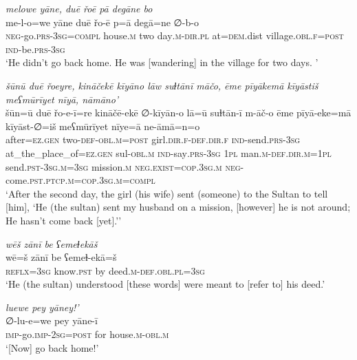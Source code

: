 \ea \label{ŽH.109}
\textit{melowe yāne, duē řoē pā degāne bo} \\ 
\gll me-l-o=we yāne duē řo-ē p=ā degā=ne ∅-b-o \\ 
 \textsc{neg-}go\textsc{.prs}\textsc{-3sg}\textsc{=compl} house\textsc{.m} two day\textsc{.m}\textsc{-dir}\textsc{.pl} at\textsc{=dem}.dist village\textsc{.obl}\textsc{\textsc{.f}}\textsc{=\textsc{post}} \textsc{ind-}be\textsc{.prs}\textsc{-3sg} \\ 
\glt `He didn’t go back home. He was [wandering] in the village for two days. '
\z 
 
\ea \label{ŽH.110}
\textit{šūnū duē řoeyre, kināčekē kīyāno lāw suɫtānī māčo, ēme pīyākemā kīyāstiš meʕmūrīyet nīyā, nāmāno’} \\ 
\gll šūn=ū duē řo-e-ī=re kināčē-ekē ∅-kīyān-o lā=ū suɫtān-ī m-āč-o ēme pīyā-eke=mā kīyāst-∅=iš meʕmūrīyet nīye=ā ne-āmā=n=o \\ 
 after\textsc{=ez}\textsc{.gen} two\textsc{-def}\textsc{-obl}\textsc{.m}\textsc{=\textsc{post}} girl\textsc{.dir}\textsc{\textsc{.f}}\textsc{-def}\textsc{.dir}\textsc{\textsc{.f}} \textsc{ind-}send\textsc{.prs}\textsc{-3sg} at\_the\_place\_of\textsc{=ez}\textsc{.gen} sul\textsc{-obl}\textsc{.m} \textsc{ind-}say\textsc{.prs}\textsc{-3sg} \textsc{1pl} man\textsc{.m}\textsc{-def}\textsc{.dir}\textsc{.m}\textsc{=1pl} send\textsc{.pst}\textsc{-3sg}\textsc{.m}\textsc{=3sg} mission\textsc{.m} \textsc{\textsc{neg.}exist}\textsc{=cop}\textsc{.3sg}\textsc{.m} \textsc{neg-}come\textsc{.pst}\textsc{.ptcp}\textsc{.m}\textsc{=cop}\textsc{.3sg}\textsc{.m}\textsc{=compl} \\ 
\glt `After the second day, the girl (his wife) sent (someone) to the Sultan to tell [him], ‘He (the sultan) sent my husband on a mission, [however] he is not around; He hasn’t come back [yet].’'
\z 
 
\ea \label{ŽH.115}
\textit{wēš zānī be ʕemeɫekāš} \\ 
\gll wē=š zānī be ʕemeɫ-ekā=š \\ 
 \textsc{reflx}\textsc{=3sg} know\textsc{.pst} by deed\textsc{.m}\textsc{-def}\textsc{.obl}\textsc{.pl}\textsc{=3sg} \\ 
\glt `He (the sultan) understood [these words] were meant to [refer to] his deed.'
\z 
 
\ea \label{ŽH.118}
\textit{luewe pey yāney!’} \\ 
\gll ∅-lu-e=we pey yāne-ī \\ 
 \textsc{imp-}go.\textsc{imp-}\textsc{2sg}\textsc{=\textsc{post}} for house\textsc{.m}\textsc{-obl}\textsc{.m} \\ 
\glt `[Now] go back home!'
\z 
 
